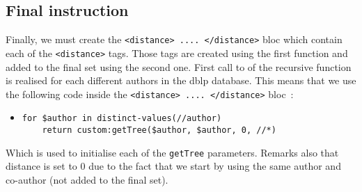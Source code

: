 \documentclass{article}
\begin{document}
\subsection{Final instruction}
Finally, we must create the \verb|<distance> .... </distance>| bloc which contain each of the \verb|<distance>| tags. Those tags are created using the first function and added to the final set using the second one. First call to of the recursive function is realised for each different authors in the dblp database. This means that we use the following code inside the \verb|<distance> .... </distance>| bloc~:
\begin{itemize}
\item \begin{verbatim}
for $author in distinct-values(//author)
    return custom:getTree($author, $author, 0, //*)
\end{verbatim}
\end{itemize}
Which is used to initialise each of the \verb|getTree| parameters. Remarks also that distance is set to 0 due to the fact that we start by using the same author and co-author (not added to the final set).
\end{document}
